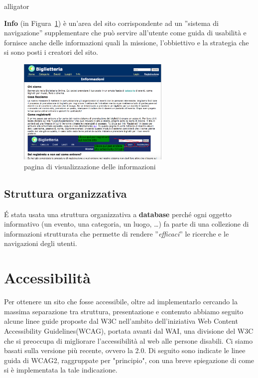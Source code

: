 \documentclass[10pt, a4paper]{article}
\begin{document}
\begin{labeling}{alligator}
\item[\textbf{\textcolor{UniPD}{Info}}] (in Figura~\ref{fig:info}) è un'area del sito corrispondente ad un 
''sistema di navigazione'' supplementare che può servire all'utente come guida
di usabilità e fornisce anche delle informazioni quali la missione, l'obbiettivo
e la strategia che si sono posti i creatori del sito.

\begin{figure}[h!]
	\centering
	\includegraphics[width=0.65\textwidth]{Images/info.png}
	\caption{pagina di visualizzazione delle informazioni}
	\label{fig:info}
\end{figure}
\end{labeling}

\subsection{Struttura organizzativa}
É stata usata una struttura organizzativa a \textbf{database} perché ogni oggetto
informativo (un evento, una categoria, un luogo, \dots) fa parte di una collezione
di informazioni strutturata che permette di rendere ''\emph{efficaci}'' le ricerche
e le navigazioni degli utenti.


\section{Accessibilità}
Per ottenere un sito che fosse accessibile, oltre ad implementarlo cercando la massima separazione tra struttura, presentazione e contenuto abbiamo seguito alcune linee guide proposte dal W3C nell'ambito dell'iniziativa Web Content Accessibility Guidelines(WCAG), portata avanti dal WAI, una divisione del W3C che si preoccupa di migliorare l'accessibilità al web alle persone disabili. Ci siamo basati sulla versione più recente, ovvero la 2.0. Di seguito sono indicate le linee guida di WCAG2, raggruppate per "principio", con una breve spiegazione di come si è implementata la tale indicazione.
\end{document}
